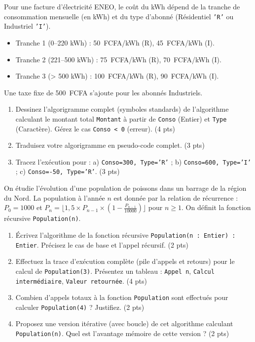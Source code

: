 \documentclass[11pt]{article}
\begin{document}
\begin{exercice}
Pour une facture d'électricité ENEO, le coût du kWh dépend de la tranche de consommation mensuelle (en kWh) et du type d'abonné (Résidentiel \texttt{'R'} ou Industriel \texttt{'I'}).
\begin{itemize}
    \item Tranche 1 (0--220 kWh) : \SI{50}{FCFA/kWh} (R), \SI{45}{FCFA/kWh} (I).
    \item Tranche 2 (221--500 kWh) : \SI{75}{FCFA/kWh} (R), \SI{70}{FCFA/kWh} (I).
    \item Tranche 3 (> 500 kWh) : \SI{100}{FCFA/kWh} (R), \SI{90}{FCFA/kWh} (I).
\end{itemize}
Une taxe fixe de \SI{500}{FCFA} s'ajoute pour les abonnés Industriels.
\begin{enumerate}
    \item Dessinez l'algorigramme complet (symboles standards) de l'algorithme calculant le montant total \texttt{Montant} à partir de \texttt{Conso} (Entier) et \texttt{Type} (Caractère). Gérez le cas \texttt{Conso < 0} (erreur). (4 pts)
    \item Traduisez votre algorigramme en pseudo-code complet. (3 pts)
    \item Tracez l'exécution pour : a) \texttt{Conso=300, Type='R'} ; b) \texttt{Conso=600, Type='I'} ; c) \texttt{Conso=-50, Type='R'}. (3 pts)
\end{enumerate}
\end{exercice}

\begin{exercice}
On étudie l'évolution d'une population de poissons dans un barrage de la région du Nord. La population à l'année $n$ est donnée par la relation de récurrence : $P_0 = 1000$ et $P_{n} = \lfloor 1,5 \times P_{n-1} \times (1 - \frac{P_{n-1}}{10000}) \rfloor$ pour $n \ge 1$. On définit la fonction récursive \texttt{Population(n)}.
\begin{enumerate}
    \item Écrivez l'algorithme de la fonction récursive \texttt{Population(n : Entier) : Entier}. Précisez le cas de base et l'appel récursif. (2 pts)
    \item Effectuez la trace d'exécution complète (pile d'appels et retours) pour le calcul de \texttt{Population(3)}. Présentez un tableau : \texttt{Appel n}, \texttt{Calcul intermédiaire}, \texttt{Valeur retournée}. (4 pts)
    \item Combien d'appels totaux à la fonction \texttt{Population} sont effectués pour calculer \texttt{Population(4)} ? Justifiez. (2 pts)
    \item Proposez une version itérative (avec boucle) de cet algorithme calculant \texttt{Population(n)}. Quel est l'avantage mémoire de cette version ? (2 pts)
\end{enumerate}
\end{exercice}
\end{document}
